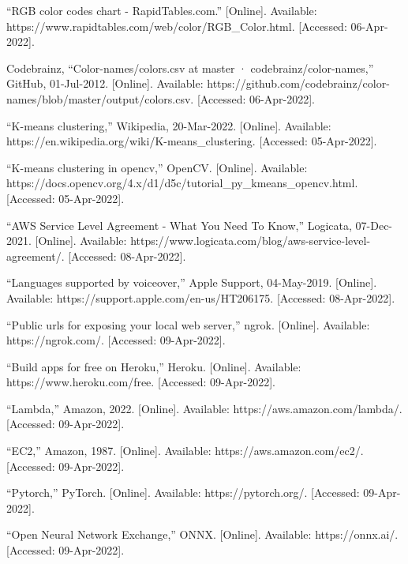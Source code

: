 \documentclass[a4paper,11pt]{article}
\begin{document}
\begin{thebibliography}{9}
“RGB color codes chart - RapidTables.com.” [Online]. Available: https://www.rapidtables.com/web/color/RGB\_Color.html. [Accessed: 06-Apr-2022]. 

Codebrainz, “Color-names/colors.csv at master · codebrainz/color-names,” GitHub, 01-Jul-2012. [Online]. Available: https://github.com/codebrainz/color-names/blob/master/output/colors.csv. [Accessed: 06-Apr-2022]. 

“K-means clustering,” Wikipedia, 20-Mar-2022. [Online]. Available: https://en.wikipedia.org/wiki/K-means\_clustering. [Accessed: 05-Apr-2022].

“K-means clustering in opencv,” OpenCV. [Online]. Available: https://docs.opencv.org/4.x/d1/d5c/tutorial\_py\_kmeans\_opencv.html. [Accessed: 05-Apr-2022]. 

“AWS Service Level Agreement - What You Need To Know,” Logicata, 07-Dec-2021. [Online]. Available: https://www.logicata.com/blog/aws-service-level-agreement/. [Accessed: 08-Apr-2022].

“Languages supported by voiceover,” Apple Support, 04-May-2019. [Online]. Available: https://support.apple.com/en-us/HT206175. [Accessed: 08-Apr-2022]. 

“Public urls for exposing your local web server,” ngrok. [Online]. Available: https://ngrok.com/. [Accessed: 09-Apr-2022]. 

“Build apps for free on Heroku,” Heroku. [Online]. Available: https://www.heroku.com/free. [Accessed: 09-Apr-2022].

“Lambda,” Amazon, 2022. [Online]. Available: https://aws.amazon.com/lambda/. [Accessed: 09-Apr-2022]. 

“EC2,” Amazon, 1987. [Online]. Available: https://aws.amazon.com/ec2/. [Accessed: 09-Apr-2022].

“Pytorch,” PyTorch. [Online]. Available: https://pytorch.org/. [Accessed: 09-Apr-2022]. 

“Open Neural Network Exchange,” ONNX. [Online]. Available: https://onnx.ai/. [Accessed: 09-Apr-2022]. 


\end{thebibliography}
\end{document}
